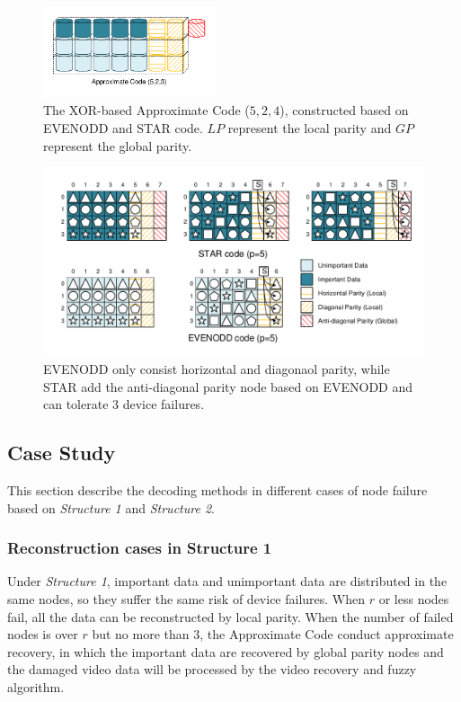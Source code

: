 \documentclass[sigconf]{acmart}
\begin{document}
\begin{figure}[]
\centering
\includegraphics[width=0.45\textwidth]{photo/AP-523.pdf}
\caption{The XOR-based Approximate Code ($5,2,4$), constructed based on EVENODD and STAR code. $LP$ represent the local parity and $GP$ represent the global parity.}
\label{fig-ap-STAR}
\end{figure}

\begin{figure}[]

\includegraphics[width = 0.98 \linewidth]{photo/EVENODD-STAR.pdf}

\caption{EVENODD only consist horizontal and diagonaol parity, while STAR add the anti-diagonal parity node based on EVENODD and can tolerate 3 device failures.}\label{fig-star}
\end{figure}

\subsection{Case Study}
This section describe the decoding methods in different cases of node failure based on \emph{Structure 1} and \emph{Structure 2}.

\subsubsection{Reconstruction cases in Structure 1}
Under \emph{Structure 1}, important data and unimportant data are distributed in the same nodes, so they suffer the same risk of device failures. 
When $r$ or less nodes fail, all the data can be reconstructed by local parity.
When the number of failed nodes is over $r$ but no more than 3, the Approximate Code conduct approximate recovery, in which the important data are recovered by global parity nodes and the damaged video data will be processed by the video recovery and fuzzy algorithm.
\end{document}
